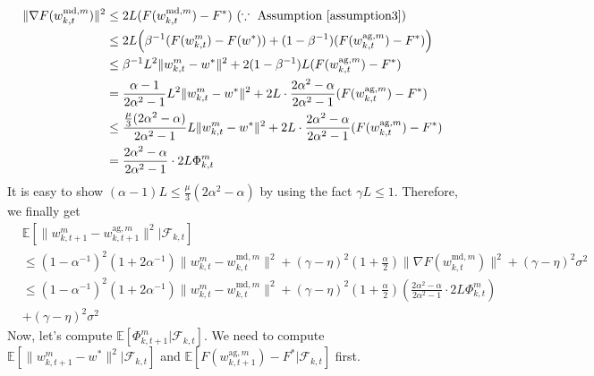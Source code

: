 \documentclass[11pt]{article}
\begin{document}
\begin{align} \label{ineqD.5-2}
    \|\nabla F(w_{k, t}^{\textrm{md}, m})\|^2 &\leq 2L(F(w_{k, t}^{\textrm{md}, m}) - F^*) \textrm{ }(\because \textrm{ Assumption \ref{assumption3}}) \nonumber\\
    &\leq 2L\Big(\beta^{-1}(F(w_{k, t}^m)-F(w^*))+(1-\beta^{-1})(F(w_{k, t}^{\textrm{ag}, m})-F^*)\Big) \nonumber\\
    &\leq \beta^{-1}L^2 \|w_{k, t}^m - w^*\|^2 + 2(1-\beta^{-1})L(F(w_{k, t}^{\textrm{ag}, m})-F^*) \nonumber\\
    &= \frac{\alpha-1}{2\alpha^2-1} L^2 \|w_{k, t}^m - w^*\|^2 + 2L\cdot\frac{2\alpha^2-\alpha}{2\alpha^2-1}(F(w_{k, t}^{\textrm{ag}, m})-F^*) \nonumber\\
    &\leq \frac{\frac{\mu}{3}(2\alpha^2-\alpha)}{2\alpha^2-1} L \|w_{k, t}^m - w^*\|^2 + 2L\cdot\frac{2\alpha^2-\alpha}{2\alpha^2-1}(F(w_{k, t}^{\textrm{ag}, m})-F^*) \nonumber\\
    &= \frac{2\alpha^2-\alpha}{2\alpha^2-1}\cdot 2L \Phi_{k, t}^m
\end{align}
It is easy to show $(\alpha-1)L \leq \frac{\mu}{3}(2\alpha^2-\alpha)$ by using the fact $\gamma L \leq 1$. Therefore, we finally get
\begin{align} \label{ineqD.5-3}
    &\mathbb{E}[\|w_{k, t+1}^m - w_{k, t+1}^{\textrm{ag}, m}\|^2|\mathcal{F}_{k, t}] \nonumber\\
    &\leq (1-\alpha^{-1})^2(1+2\alpha^{-1}) \|w_{k, t}^m - w_{k, t}^{\textrm{md}, m}\|^2 + (\gamma-\eta)^2(1+\frac{\alpha}{2}) \|\nabla F(w_{k, t}^{\textrm{md}, m})\|^2 + (\gamma-\eta)^2 \sigma^2 \nonumber\\
    &\leq (1-\alpha^{-1})^2(1+2\alpha^{-1}) \|w_{k, t}^m - w_{k, t}^{\textrm{md}, m}\|^2 + (\gamma-\eta)^2(1+\frac{\alpha}{2}) (\frac{2\alpha^2-\alpha}{2\alpha^2-1}\cdot 2L \Phi_{k, t}^m) \nonumber\\
    &+ (\gamma-\eta)^2 \sigma^2
\end{align}
Now, let's compute $\mathbb{E}[\Phi_{k, t+1}^m|\mathcal{F}_{k, t}]$. We need to compute $\mathbb{E}[\|w_{k, t+1}^m-w^*\|^2|\mathcal{F}_{k, t}]$ and $\mathbb{E}[F(w_{k, t+1}^{\textrm{ag}, m}) - F^*|\mathcal{F}_{k, t}]$ first.
\end{document}
